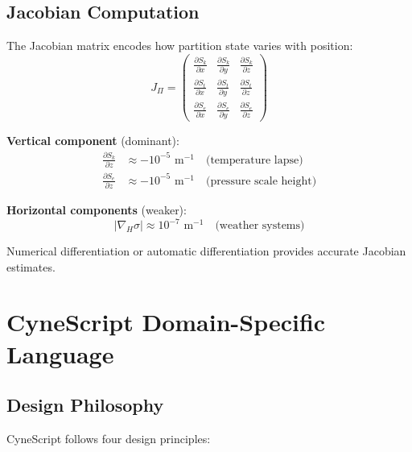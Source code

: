 \documentclass[twocolumn,10pt,a4paper]{article}
\theoremstyle{definition}
\theoremstyle{remark}
\begin{document}
\subsection{Jacobian Computation}

The Jacobian matrix encodes how partition state varies with position:
\begin{equation}
    J_{\Pi} = \begin{pmatrix}
        \frac{\partial S_k}{\partial x} & \frac{\partial S_k}{\partial y} & \frac{\partial S_k}{\partial z} \\[0.3em]
        \frac{\partial S_t}{\partial x} & \frac{\partial S_t}{\partial y} & \frac{\partial S_t}{\partial z} \\[0.3em]
        \frac{\partial S_e}{\partial x} & \frac{\partial S_e}{\partial y} & \frac{\partial S_e}{\partial z}
    \end{pmatrix}
\end{equation}

\textbf{Vertical component} (dominant):
\begin{align}
    \frac{\partial S_k}{\partial z} &\approx -10^{-5} \text{ m}^{-1} \quad \text{(temperature lapse)} \\
    \frac{\partial S_e}{\partial z} &\approx -10^{-5} \text{ m}^{-1} \quad \text{(pressure scale height)}
\end{align}

\textbf{Horizontal components} (weaker):
\begin{equation}
    |\nabla_H \sigma| \approx 10^{-7} \text{ m}^{-1} \quad \text{(weather systems)}
\end{equation}

Numerical differentiation or automatic differentiation \cite{griewank2008auto} provides accurate Jacobian estimates.

\section{CyneScript Domain-Specific Language}
\label{sec:language}

\subsection{Design Philosophy}

CyneScript follows four design principles:
\end{document}
